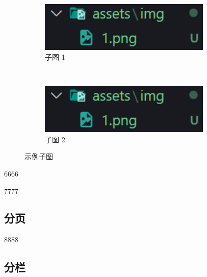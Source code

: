 \documentclass[14pt,a4paper,UTF8,twoside]{article}
\begin{document}
\begin{figure} [H]
    \centering
    \begin{subfigure}{0.45\textwidth}
        \centering
        \includegraphics[width=0.9\textwidth]{../assets/img/1.png}
        \caption{子图 1}
        \label{fig:subfig1}
    \end{subfigure}

    \

    \begin{subfigure}{0.45\textwidth}
        \centering
        \includegraphics[width=0.9\textwidth]{../assets/img/1.png}
        \caption{子图 2}
        \label{fig:subfig2}
    \end{subfigure}
    \caption{示例子图}
    \label{fig:subfig}
\end{figure}

6666

\vspace{1cm}

7777

\newpage %

\subsection{分页}


8888

\subsection{分栏}
\end{document}
